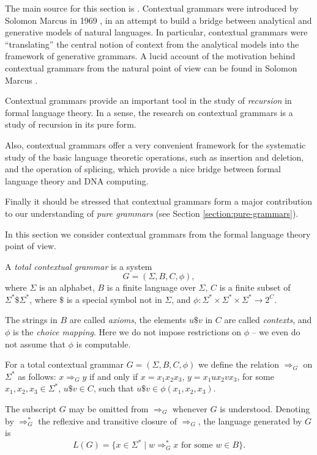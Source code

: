 The main source for this section is \cite{EhPaRo1997contextual}.
Contextual grammars were introduced by Solomon Marcus 
in 1969 \cite{M69}, in an attempt to build a bridge between analytical and generative 
models of natural languages. In particular, contextual grammars were ``translating'' 
the central notion of context from the analytical models into the framework of 
generative grammars. A lucid account of the motivation behind contextual grammars 
from the natural point of view can be found in Solomon Marcus \cite{Ma1997contextual}.

Contextual grammars provide an important tool in the study of \emph{recursion}
in formal language theory. In a sense, the research on contextual grammars is
a study of recursion in its pure form.

Also, contextual grammars offer a very convenient framework for the systematic
study of the basic language theoretic operations, such as insertion and deletion,
and the operation of splicing, which provide a nice bridge between formal language
theory and DNA computing.

Finally it should be stressed that contextual grammars form a major contribution
to our understanding of \emph{pure grammars} 
(see Section \ref{section:pure-grammars}).

In this section we consider contextual grammars from the formal language theory
point of view.

A \emph{total contextual grammar} is a system
$$G = (\Sigma, B, C, \phi),$$
where $\Sigma$ is an alphabet, $B$ is a finite language over $\Sigma$, $C$ is a finite
subset of $\Sigma^* \$ \Sigma^*$, where $\$$ is a special symbol not in $\Sigma$, and
$\phi: \Sigma^* \times \Sigma^* \times \Sigma^* \to 2^C$.

The strings in $B$ are called \emph{axioms}, the elements $u \$ v$ in $C$ 
are called \emph{contexts}, and $\phi$ is the 
\emph{choice mapping}. Here we do not impose restrictions on $\phi$ -- we even do not 
assume that $\phi$ is computable.

For a total contextual grammar $G = (\Sigma, B, C, \phi)$
we define the relation $\Rightarrow_G$ on $\Sigma^*$ as follows:
$x \Rightarrow_G y$ if and only if $x = x_1 x_2 x_3$, $y = x_1 u x_2 v x_3$,
for some $x_1, x_2, x_3 \in \Sigma^*$, $u \$ v \in C$, such that
$u \$ v \in \phi(x_1, x_2, x_3)$.

The subscript $G$ may be omitted from $\Rightarrow_G$ whenever $G$ is understood.
Denoting by $\Rightarrow^*_G$ the reflexive and transitive closure of $\Rightarrow_G$,
the language generated by $G$ is
$$L(G) = \{x \in \Sigma^* \mid w \Rightarrow^*_G x \text{ for some } w \in B\}.$$

